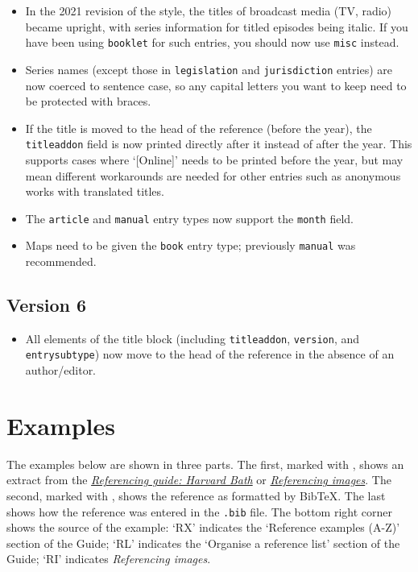 \documentclass[10pt,a4paper]{article}
\begin{document}
\begin{itemize}
\item
  In the 2021 revision of the style, the titles of broadcast media (TV, radio)
  became upright, with series information for titled episodes being italic.
  If you have been using \texttt{booklet} for such entries, you should now use \texttt{misc} instead.
\item
  Series names (except those in \texttt{legislation} and \texttt{jurisdiction}
  entries) are now coerced to sentence case, so any capital letters you
  want to keep need to be protected with braces.
\item
  If the title is moved to the head of the reference (before the year),
  the \texttt{titleaddon} field is now printed directly after it instead of after the year.
  This supports cases where `[Online]' needs to be printed before the year,
  but may mean different workarounds are needed for other entries such as anonymous works with translated titles.
\item
  The \texttt{article} and \texttt{manual} entry types now support the \texttt{month} field.
\item
  Maps need to be given the \texttt{book} entry type; previously \texttt{manual} was recommended.
\end{itemize}

\subsection{Version 6}

\begin{itemize}
\item
  All elements of the title block (including \texttt{titleaddon},
  \texttt{version}, and \texttt{entrysubtype}) now move to the head of the
  reference in the absence of an author\slash editor.
\end{itemize}

\section{Examples}

The examples below are shown in three parts.
The first, marked with \faBook, shows an extract from the
\href{https://library.bath.ac.uk/referencing/harvard-bath}{\emph{Referencing guide: Harvard Bath}} or
\href{https://library.bath.ac.uk/images/referencing}{\emph{Referencing images}}.
The second, marked with \faCog, shows the reference as formatted by Bib\TeX.
The last shows how the reference was entered in the \texttt{.bib} file.
The bottom right corner shows the source of the example: `RX' indicates the `Reference examples (A-Z)' section of the Guide; `RL' indicates the `Organise a reference list' section of the Guide; `RI' indicates \emph{Referencing images}.
\end{document}
